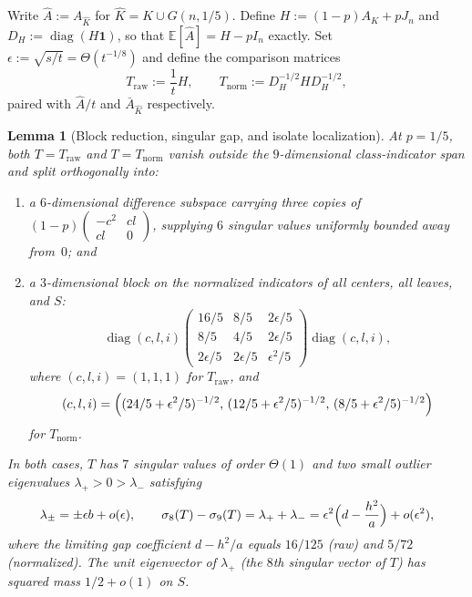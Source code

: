 \documentclass[11pt]{article}
\theoremstyle{plain}
\newtheorem{lemma}[theorem]{Lemma}
\theoremstyle{definition}
\theoremstyle{remark}
\DeclareMathOperator{\diag}{diag}
\begin{document}
Write $\hat{A} := A_{\hat{K}}$ for $\hat{K} = K \cup G(n, 1/5)$. Define $H := (1 - p)A_K + p J_n$ and $D_H := \diag(H\mathbf{1})$, so that $\mathbb{E}[\hat{A}] = H - p I_n$ exactly. Set $\epsilon := \sqrt{s/t} = \Theta(t^{-1/8})$ and define the comparison matrices
\[
T_{\mathrm{raw}} := \frac{1}{t}H, \qquad T_{\mathrm{norm}} := D_H^{-1/2} H D_H^{-1/2},
\]
paired with $\hat{A}/t$ and $\bar{A}_{\hat{K}}$ respectively.

\begin{lemma}[Block reduction, singular gap, and isolate localization]\label{lem:quotient}
At $p = 1/5$, both $T = T_{\mathrm{raw}}$ and $T = T_{\mathrm{norm}}$ vanish outside the $9$-dimensional class-indicator span and split orthogonally into:
\begin{enumerate}[label=\textup{(\arabic*)}]
\item a $6$-dimensional difference subspace carrying three copies of $(1-p)\begin{pmatrix} -c^2 & cl \\ cl & 0 \end{pmatrix}$, supplying $6$ singular values uniformly bounded away from~$0$; and
\item a $3$-dimensional block on the normalized indicators of all centers, all leaves, and $S$:
\[
\diag(c, l, i)
\begin{pmatrix}
16/5 & 8/5 & 2\epsilon/5 \\
8/5 & 4/5 & 2\epsilon/5 \\
2\epsilon/5 & 2\epsilon/5 & \epsilon^2/5
\end{pmatrix}
\diag(c, l, i),
\]
where $(c, l, i) = (1, 1, 1)$ for $T_{\mathrm{raw}}$, and
\[
(c, l, i) = \Bigl((24/5 + \epsilon^2/5)^{-1/2},\, (12/5 + \epsilon^2/5)^{-1/2},\, (8/5 + \epsilon^2/5)^{-1/2}\Bigr)
\]
for $T_{\mathrm{norm}}$.
\end{enumerate}
In both cases, $T$ has $7$ singular values of order $\Theta(1)$ and two small outlier eigenvalues $\lambda_+ > 0 > \lambda_-$ satisfying
\[
\lambda_\pm = \pm\epsilon b + o(\epsilon), \qquad
\sigma_8(T) - \sigma_9(T) = \lambda_+ + \lambda_- = \epsilon^2\Bigl(d - \frac{h^2}{a}\Bigr) + o(\epsilon^2),
\]
where the limiting gap coefficient $d - h^2/a$ equals $16/125$ (raw) and $5/72$ (normalized). The unit eigenvector of $\lambda_+$ (the $8$th singular vector of $T$) has squared mass $1/2 + o(1)$ on $S$.
\end{lemma}
\end{document}
